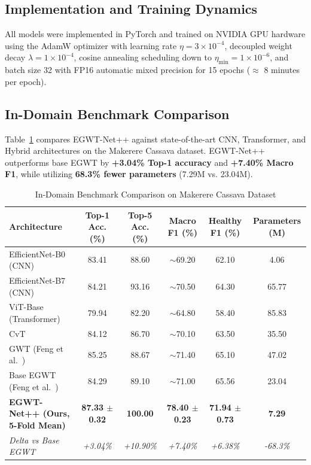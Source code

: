 \documentclass[conference]{IEEEtran}
\let\origsubsection\subsection
\renewcommand{\subsection}{\needspace{5\baselineskip}\origsubsection}
\begin{document}
\subsection{Implementation and Training Dynamics}
All models were implemented in PyTorch and trained on NVIDIA GPU hardware using the AdamW optimizer with learning rate $\eta = 3 \times 10^{-4}$, decoupled weight decay $\lambda = 1 \times 10^{-4}$, cosine annealing scheduling down to $\eta_{\text{min}} = 1 \times 10^{-6}$, and batch size 32 with FP16 automatic mixed precision for 15 epochs ($\approx$ 8 minutes per epoch).

\subsection{In-Domain Benchmark Comparison}
Table~\ref{tab:benchmark} compares EGWT-Net++ against state-of-the-art CNN, Transformer, and Hybrid architectures on the Makerere Cassava dataset. EGWT-Net++ outperforms base EGWT by \textbf{+3.04\% Top-1 accuracy} and \textbf{+7.40\% Macro F1}, while utilizing \textbf{68.3\% fewer parameters} (7.29M vs. 23.04M).

\begin{table}[t]
\centering
\caption{In-Domain Benchmark Comparison on Makerere Cassava Dataset}
\label{tab:benchmark}
\renewcommand{\arraystretch}{1.2}
\begin{tabular*}{\textwidth}{@{\extracolsep{\fill}}lccccc@{}}
\toprule
\textbf{Architecture} & \textbf{Top-1 Acc. (\%)} & \textbf{Top-5 Acc. (\%)} & \textbf{Macro F1 (\%)} & \textbf{Healthy F1 (\%)} & \textbf{Parameters (M)} \\
\midrule
EfficientNet-B0 (CNN)               & 83.41 & 88.60 & $\sim$69.20 & 62.10 & 4.06 \\
EfficientNet-B7 (CNN)               & 84.21 & 93.16 & $\sim$70.50 & 64.30 & 65.77 \\
ViT-Base (Transformer)              & 79.94 & 82.20 & $\sim$64.80 & 58.40 & 85.83 \\
CvT~\cite{cvt}                      & 84.12 & 86.70 & $\sim$70.10 & 63.50 & 35.50 \\
GWT (Feng et al.~\cite{feng2024})   & 85.25 & 88.67 & $\sim$71.40 & 65.10 & 47.02 \\
Base EGWT (Feng et al.~\cite{feng2024}) & 84.29 & 89.10 & $\sim$71.00 & 65.56 & 23.04 \\
\midrule
\textbf{EGWT-Net++ (Ours, 5-Fold Mean)} & \textbf{87.33 $\pm$ 0.32} & \textbf{100.00} & \textbf{78.40 $\pm$ 0.23} & \textbf{71.94 $\pm$ 0.73} & \textbf{7.29} \\
\textit{Delta vs Base EGWT~\cite{feng2024}} & \textit{+3.04\%} & \textit{+10.90\%} & \textit{+7.40\%} & \textit{+6.38\%} & \textit{-68.3\%} \\
\bottomrule
\end{tabular*}
\end{table}
\end{document}
